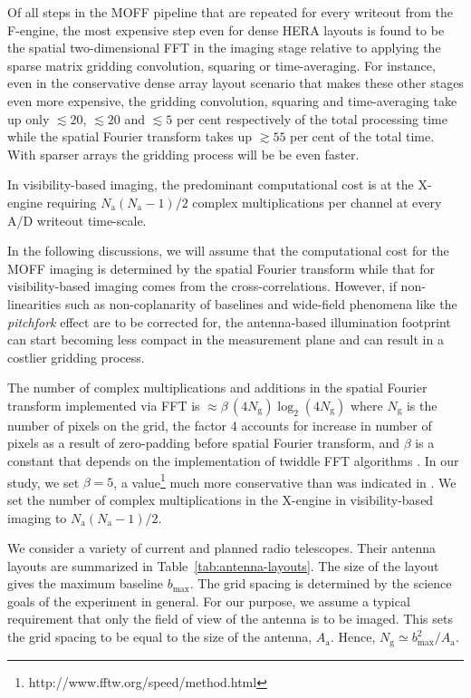 \documentclass[a4paper,fleqn,usenatbib]{mnras}
\newcommand{\Nant}{N_\textrm{a}}
\newcommand{\Ngrid}{N_\textrm{g}}
\begin{document}
Of all steps in the MOFF pipeline that are repeated for every writeout from 
the F-engine, the most expensive step even for dense HERA layouts is found to be 
the spatial two-dimensional FFT in the imaging stage relative to applying the 
sparse matrix gridding convolution, squaring or time-averaging. For instance, 
even in the conservative dense array layout scenario that makes these other 
stages even more expensive, the gridding convolution, squaring and time-averaging 
take up only $\lesssim 20$, $\lesssim 20$ and $\lesssim 5$ per cent respectively 
of the total processing time while the spatial Fourier transform takes up 
$\gtrsim 55$ per cent of the total time. With sparser arrays the gridding process 
will be be even faster. 

In visibility-based imaging, the predominant computational cost is at the 
X-engine requiring $\Nant(\Nant-1)/2$ complex multiplications per channel at 
every A/D writeout time-scale. 

In the following discussions, we will assume that the computational cost for
the MOFF imaging is determined by the spatial Fourier transform while  
that for visibility-based imaging comes from the cross-correlations. However, 
if non-linearities such as non-coplanarity of baselines \citep{cor08} and 
wide-field phenomena like the {\it pitchfork} effect \citep{thy15a,thy15b} 
are to be corrected for, the antenna-based illumination footprint can start 
becoming less compact in the measurement plane and can result in a costlier 
gridding process.

The number of complex multiplications and additions in the spatial Fourier 
transform implemented via FFT is $\approx \beta\,(4\Ngrid)\log_2(4\Ngrid)$ 
where $\Ngrid$ is the number of pixels on the grid, the factor 4 accounts for 
increase in number of pixels as a result of zero-padding before spatial Fourier 
transform, and $\beta$ is a constant that depends on the implementation of 
twiddle FFT algorithms \citep{bri74}. In our study, we set $\beta=5$, a 
value\footnote{http://www.fftw.org/speed/method.html} much more conservative 
than was indicated in \citet{mor11}. We set the number of complex 
multiplications in the X-engine in visibility-based imaging to 
$\Nant(\Nant-1)/2$.

We consider a variety of current and planned radio telescopes. Their antenna 
layouts are summarized in Table~\ref{tab:antenna-layouts}. The size of the 
layout gives the maximum baseline $b_\textrm{max}$. The grid spacing is 
determined by the science goals of the experiment in general. For our 
purpose, we assume a typical requirement that only the field of view of the 
antenna is to be imaged. This sets the grid spacing to be equal to the size 
of the antenna, $A_\textrm{a}$. Hence, 
$\Ngrid\simeq b_\textrm{max}^2/A_\textrm{a}$. 
\end{document}
